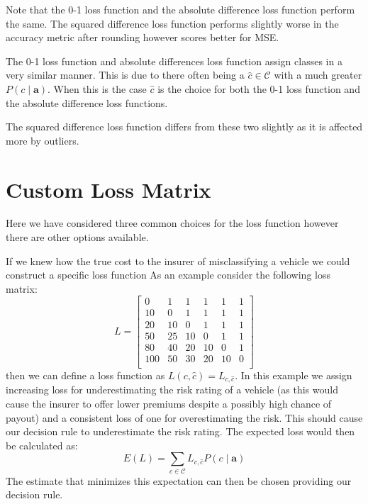 Note that the 0-1 loss function and the absolute difference loss function perform the same.
The squared difference loss function performs slightly worse in the accuracy metric after rounding however scores better for MSE.

The 0-1 loss function and absolute differences loss function assign classes in a very similar manner.
This is due to there often being a $\hat{c} \in \mathcal{C}$ with a much greater $P(c \mid \mathbf{a})$.
When this is the case $\hat{c}$ is the choice for both the 0-1 loss function and the absolute difference loss functions.

The squared difference loss function differs from these two slightly as it is affected more by outliers.

\section{Custom Loss Matrix}
Here we have considered three common choices for the loss function however there are other options available.

If we knew how the true cost to the insurer of misclassifying a vehicle we could construct a specific loss function
As an example consider the following loss matrix:
\begin{equation}
	L = 
		\begin{bmatrix}
			0   & 1  & 1  & 1  & 1  & 1 \\
			10  & 0  & 1  & 1  & 1  & 1 \\
			20  & 10 & 0  & 1  & 1  & 1 \\
			50  & 25 & 10 & 0  & 1  & 1 \\
			80  & 40 & 20 & 10 & 0  & 1 \\
			100 & 50 & 30 & 20 & 10 & 0 \\
		\end{bmatrix}
\end{equation}
then we can define a loss function as $L(c, \hat{c}) = L_{c,\hat{c}}$.
In this example we assign increasing loss for underestimating the risk rating of a vehicle (as this would cause the insurer to offer lower premiums despite a possibly high chance of payout) and a consistent loss of one for overestimating the risk.
This should cause our decision rule to underestimate the risk rating.
The expected loss would then be calculated as:
\begin{equation}
	E(L) = \sum_{c \in \mathcal{C}} L_{c,\hat{c}}P(c \mid \mathbf{a})
\end{equation}
The estimate that minimizes this expectation can then be chosen providing our decision rule.

